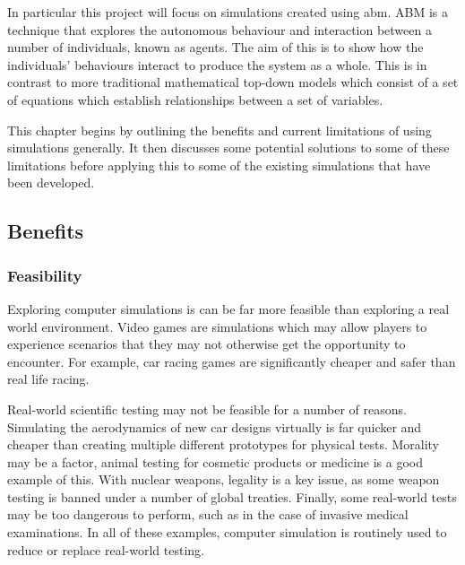 \documentclass{UoYCSproject}
\begin{document}

In particular this project will focus on simulations created using \acrfull{abm}.
ABM is a technique that explores the autonomous behaviour and interaction between a number of individuals, known as agents.
The aim of this is to show how the individuals' behaviours interact to produce the system as a whole.
This is in contrast to more traditional mathematical top-down models which consist of a set of equations which establish relationships between a set of variables.

This chapter begins by outlining the benefits and current limitations of using simulations generally.
It then discusses some potential solutions to some of these limitations before applying this to some of the existing simulations that have been developed.

\subsection{Benefits}
\subsubsection{Feasibility}
Exploring computer simulations is can be far more feasible than exploring a real world environment.
Video games are simulations which may allow players to experience scenarios that they may not otherwise get the opportunity to encounter.
For example, car racing games are significantly cheaper and safer than real life racing.

Real-world scientific testing may not be feasible for a number of reasons.
Simulating the aerodynamics of new car designs virtually is far quicker and cheaper than creating multiple different prototypes for physical tests.
Morality may be a factor, animal testing for cosmetic products or medicine is a good example of this. With nuclear weapons, legality is a key issue, as some weapon testing is banned under a number of global treaties\cite{partial_nuclear_test_ban_treaty, threshold_test_ban_treaty}.
Finally, some real-world tests may be too dangerous to perform, such as in the case of invasive medical examinations.
In all of these examples, computer simulation is routinely used to reduce or replace real-world testing.
\end{document}
